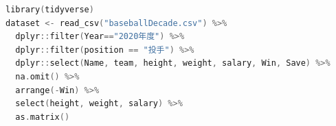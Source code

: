 \begin{lstlisting}[language=c++,label={code:09_06},caption={データファイルの読み込み}]
library(tidyverse)
dataset <- read_csv("baseballDecade.csv") %>%
  dplyr::filter(Year=="2020年度") %>% 
  dplyr::filter(position == "投手") %>%
  dplyr::select(Name, team, height, weight, salary, Win, Save) %>%
  na.omit() %>%
  arrange(-Win) %>% 
  select(height, weight, salary) %>%
  as.matrix() 
\end{lstlisting}

